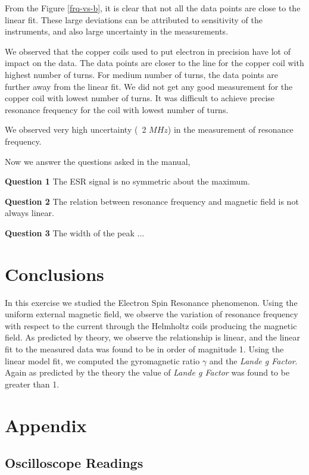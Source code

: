 \documentclass[letterpaper,12pt]{article}
\begin{document}
From the Figure \ref{frq-vs-b}, it is clear that not all the data points are close to the linear fit. These large 
deviations can be attributed to sensitivity of the instruments, and also large uncertainty in the measurements.

We observed that the copper coils used to put electron in precision have lot of impact on the data. The data points 
are closer to the line for the copper coil with highest number of turns. For medium number of turns, the 
data points are further away from the linear fit. We did not get any good measurement for the copper coil with lowest
number of turns. It was difficult to achieve precise resonance frequency for the coil with lowest number of turns.

We observed very high uncertainty (~2 $MHz$) in the measurement of resonance frequency.

Now we answer the questions asked in the manual,

\textbf{Question 1}
The ESR signal is no symmetric about the maximum. 

\textbf{Question 2}
The relation between resonance frequency and magnetic field is not always linear.

\textbf{Question 3}
The width of the peak ...

\section{Conclusions}
In this exercise we studied the Electron Spin Resonance phenomenon. Using the uniform external magnetic 
field, we observe the variation of resonance frequency with respect to the current through the Helmholtz coils
producing the magnetic field. As predicted by theory, we observe the relationship is linear, and the linear
fit to the measured data was found to be in order of magnitude 1. Using the linear model fit, we 
computed the gyromagnetic ratio $\gamma$ and the \emph{Lande g Factor}. Again as predicted by the theory 
the value of \emph{Lande g Factor} was found to be greater than 1.


\pagebreak

\appendix

\section{Appendix}

\subsection{Oscilloscope Readings}
\end{document}
